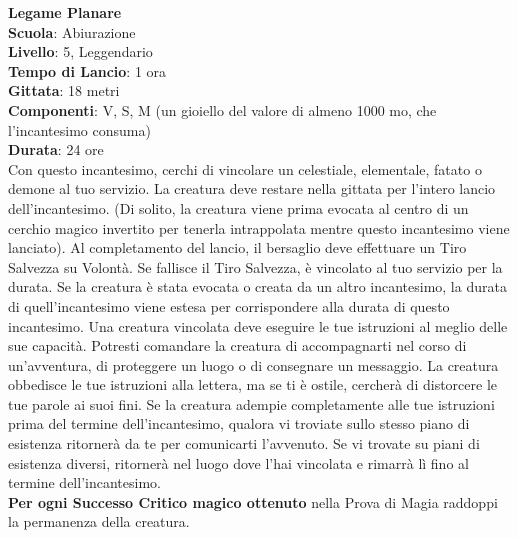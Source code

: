 \begin{multicols}{2}
\medskip\textbf{Legame Planare}\\
\textbf{Scuola}: Abiurazione\\
\textbf{Livello}: 5, Leggendario\\
\textbf{Tempo di Lancio}: 1 ora\\
\textbf{Gittata}: 18 metri\\
\textbf{Componenti}: V, S, M (un gioiello del valore di almeno 1000 mo, che l'incantesimo consuma)\\
\textbf{Durata}: 24 ore\\
Con questo incantesimo, cerchi di vincolare un celestiale, elementale, fatato o demone al tuo servizio. La creatura deve restare nella gittata per l'intero lancio dell'incantesimo. (Di solito, la creatura viene prima evocata al centro di un cerchio magico invertito per tenerla intrappolata mentre questo incantesimo viene lanciato). Al completamento del lancio, il bersaglio deve effettuare un Tiro Salvezza su Volontà. Se fallisce il Tiro Salvezza, è vincolato al tuo servizio per la durata. Se la creatura è stata evocata o creata da un altro incantesimo, la durata di quell'incantesimo viene estesa per corrispondere alla durata di questo incantesimo. Una creatura vincolata deve eseguire le tue istruzioni al meglio delle sue capacità. Potresti comandare la creatura di accompagnarti nel corso di un'avventura, di proteggere un luogo o di consegnare un messaggio. La creatura obbedisce le tue istruzioni alla lettera, ma se ti è ostile, cercherà di distorcere le tue parole ai suoi fini. Se la creatura adempie completamente alle tue istruzioni prima del termine dell'incantesimo, qualora vi troviate sullo stesso piano di esistenza ritornerà da te per comunicarti l'avvenuto. Se vi trovate su piani di esistenza diversi, ritornerà nel luogo dove l'hai vincolata e rimarrà lì fino al termine dell'incantesimo.\\
\textbf{Per ogni Successo Critico magico ottenuto} nella Prova di Magia raddoppi la permanenza della creatura.


\end{multicols}
